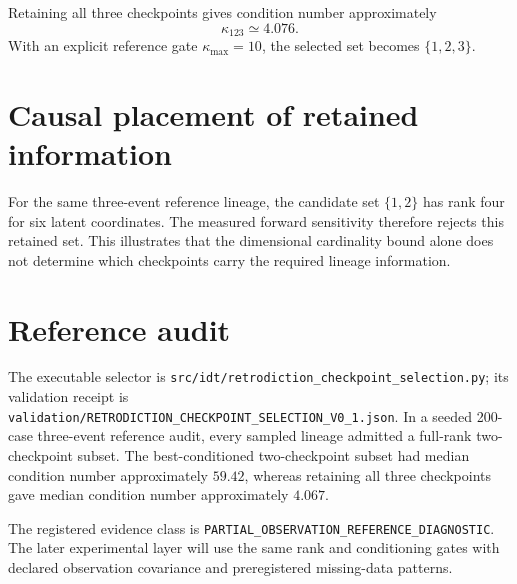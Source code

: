 Retaining all three checkpoints gives condition number approximately
\[
\boxed{\kappa_{123}\simeq4.076.}
\]
With an explicit reference gate \(\kappa_{\max}=10\), the selected set becomes \(\{1,2,3\}\).

\section{Causal placement of retained information}

For the same three-event reference lineage, the candidate set \(\{1,2\}\) has rank four for six latent coordinates. The measured forward sensitivity therefore rejects this retained set. This illustrates that the dimensional cardinality bound alone does not determine which checkpoints carry the required lineage information.

\section{Reference audit}

The executable selector is \texttt{src/idt/retrodiction\_checkpoint\_selection.py}; its validation receipt is \texttt{validation/RETRODICTION\_CHECKPOINT\_SELECTION\_V0\_1.json}. In a seeded 200-case three-event reference audit, every sampled lineage admitted a full-rank two-checkpoint subset. The best-conditioned two-checkpoint subset had median condition number approximately \(59.42\), whereas retaining all three checkpoints gave median condition number approximately \(4.067\).

The registered evidence class is \texttt{PARTIAL\_OBSERVATION\_REFERENCE\_DIAGNOSTIC}. The later experimental layer will use the same rank and conditioning gates with declared observation covariance and preregistered missing-data patterns.

